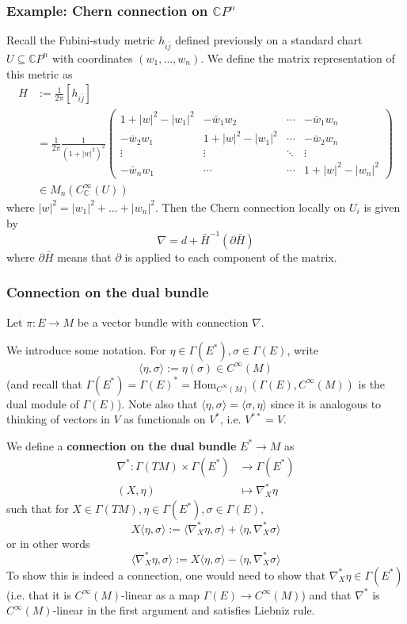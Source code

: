 \documentclass[a4paper]{article}
\theoremstyle{definition} \newtheorem*{definition}{Definition}
\theoremstyle{definition} \newtheorem*{definitions}{Definitions}
\theoremstyle{plain} \newtheorem{theorem}{Theorem}[section]
\theoremstyle{plain} \newtheorem{proposition}[theorem]{Proposition}
\theoremstyle{plain} \newtheorem{corollary}[theorem]{Corollary}
\theoremstyle{plain} \newtheorem{lemma}[theorem]{Lemma}
\theoremstyle{plain} \newtheorem{example}[theorem]{Example}
\newcommand{\defn}[1]{\textbf{#1}}
\newcommand{\complexnos}{\mathbb{C}}
\newcommand{\Hom}{\text{Hom}}
\newcommand{\smooth}{C^\infty}
\begin{document}
\subsubsection{Example: Chern connection on $\complexnos P^n$}

Recall the Fubini-study metric $h_{i\bar{j}}$ defined previously on a standard chart $U\subseteq \complexnos P^n$ with coordinates $(w_1, \dots, w_n)$. We define the matrix representation of this metric as
\begin{align*}
H & := \frac{1}{2\pi} \left[  h_{i\bar{j}} \right] \\
& = \frac{1}{2\pi} \frac{1}{(1+|w|^2)^2}\begin{pmatrix}
1+|w|^2-|w_1|^2 & -\bar{w}_1w_2 & \cdots & -\bar{w}_1w_n \\
-\bar{w}_2w_1 & 1+|w|^2-|w_1|^2 & \cdots & -\bar{w}_2w_n \\
\vdots & \vdots & \ddots & \vdots \\
-\bar{w}_nw_1 & \cdots & \cdots & 1+|w|^2-|w_n|^2
\end{pmatrix} \\
& \in M_n(\smooth_\complexnos (U))
\end{align*}
where $|w|^2 = |w_1|^2 + \ldots + |w_n|^2$. 
Then the Chern connection locally on $U_i$ is given by 
$$\nabla = d + \bar{H}^{-1}(\partial \bar{H})$$
where $\partial \bar{H}$ means that $\partial$ is applied to each component of the matrix. 

\subsubsection{Connection on the dual bundle}
Let $\pi:E\to M$ be a vector bundle with connection $\nabla$.

We introduce some notation. For $\eta\in \Gamma(E^*), \sigma\in \Gamma(E)$, write
$$\langle \eta, \sigma \rangle := \eta(\sigma)\in \smooth (M)$$
(and recall that $\Gamma(E^*)=\Gamma(E)^* = \Hom_{\smooth(M)}(\Gamma(E), \smooth(M))$ is the dual module of $\Gamma(E)$). Note also that $\langle \eta, \sigma \rangle = \langle \sigma, \eta \rangle $ since it is analogous to thinking of vectors in $V$ as functionals on $V^*$, i.e. $V^{**}=V$.

We define a \defn{connection on the dual bundle} $E^*\to M$ as 
\begin{align*}
    \nabla^* :  \Gamma(TM)\times \Gamma(E^*) & \to \Gamma(E^*) \\
    (X, \eta) & \mapsto \nabla^*_X \eta
\end{align*}
such that for $X\in \Gamma(TM), \eta\in \Gamma(E^*), \sigma\in \Gamma(E)$,
$$X \langle \eta, \sigma \rangle := \langle \nabla^*_X \eta , \sigma \rangle + \langle \eta, \nabla^*_X \sigma \rangle$$
or in other words
$$ \langle \nabla^*_X \eta , \sigma \rangle := X \langle \eta, \sigma \rangle - \langle \eta, \nabla^*_X \sigma \rangle$$
To show this is indeed a connection, one would need to show that $\nabla^*_X \eta \in \Gamma(E^*)$ (i.e. that it is $\smooth(M)$-linear as a map $\Gamma(E)\to \smooth(M)$) and that $\nabla^*$ is $\smooth(M)$-linear in the first argument and satisfies Liebniz rule. 
\end{document}
